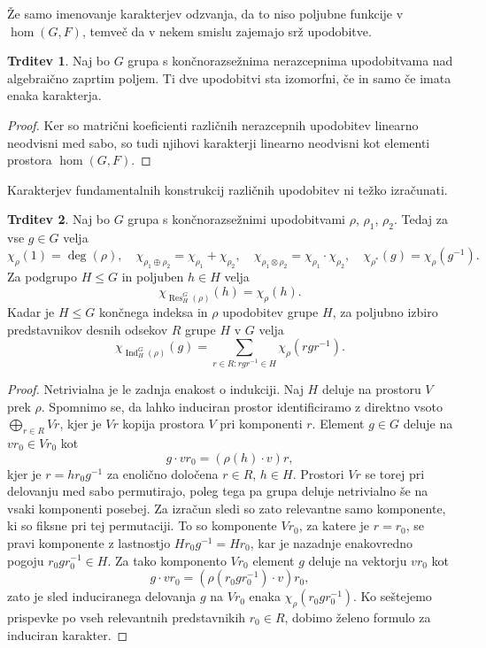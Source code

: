 \documentclass[11pt]{book}
\DeclareMathOperator\Res{Res}
\DeclareMathOperator\Ind{Ind}
\theoremstyle{definition}
\theoremstyle{zgled}
\theoremstyle{odprtproblem}
\theoremstyle{domacanaloga}
\newenvironment{dokaz}
    {\color{siva}\begin{proof}}
    {\end{proof}}
\theoremstyle{izrek}
\newtheorem*{trditev}{Trditev}
\begin{document}
Že samo imenovanje karakterjev odzvanja, da to niso poljubne funkcije v $\hom(G,F)$, temveč da v nekem smislu zajemajo srž upodobitve.

\begin{trditev}
Naj bo $G$ grupa s končnorazsežnima nerazcepnima upodobitvama nad algebraično zaprtim poljem. Ti dve upodobitvi sta izomorfni, če in samo če imata enaka karakterja.
\end{trditev}
\begin{dokaz}
Ker so matrični koeficienti različnih nerazcepnih upodobitev linearno neodvisni med sabo, so tudi njihovi karakterji linearno neodvisni kot elementi prostora $\hom(G,F)$. 
\end{dokaz}

Karakterjev fundamentalnih konstrukcij različnih upodobitev ni težko izračunati.

\begin{trditev}
Naj bo $G$ grupa s končnorazsežnimi upodobitvami $\rho$, $\rho_1$, $\rho_2$. Tedaj za vse $g \in G$ velja
\[
    \chi_{\rho}(1) = \deg(\rho), \quad
    \chi_{\rho_1 \oplus \rho_2} = \chi_{\rho_1} + \chi_{\rho_2}, \quad
    \chi_{\rho_1 \otimes \rho_2} = \chi_{\rho_1} \cdot \chi_{\rho_2}, \quad
    \chi_{\rho^*}(g) = \chi_{\rho}(g^{-1}).
\]
Za podgrupo $H \leq G$ in poljuben $h \in H$ velja
\[
    \chi_{\Res^G_H(\rho)}(h) = \chi_{\rho}(h).
\]
Kadar je $H \leq G$ končnega indeksa in $\rho$ upodobitev grupe $H$, za poljubno izbiro predstavnikov desnih odsekov $R$ grupe $H$ v $G$ velja
\[
    \chi_{\Ind^G_H(\rho)}(g) = \sum_{r \in R \colon r g r^{-1} \in H} \chi_{\rho}(r g r^{-1}).
\]
\end{trditev}
\begin{dokaz}
Netrivialna je le zadnja enakost o indukciji. Naj $H$ deluje na prostoru $V$ prek $\rho$. Spomnimo se, da lahko induciran prostor identificiramo z direktno vsoto $\bigoplus_{r \in R} V r$, kjer je $Vr$ kopija prostora $V$ pri komponenti $r$. Element $g \in G$ deluje na $v r_0 \in V r_0$ kot
\[
    g \cdot v r_0 = \left( \rho(h) \cdot v \right) r,
\]
kjer je $r = h r_0 g^{-1}$ za enolično določena $r \in R$, $h \in H$. Prostori $V r$ se torej pri delovanju med sabo permutirajo, poleg tega pa grupa deluje netrivialno še na vsaki komponenti posebej. Za izračun sledi so zato relevantne samo komponente, ki so fiksne pri tej permutaciji. To so komponente $Vr_0$, za katere je $r = r_0$, se pravi komponente z lastnostjo $H r_0 g^{-1} = H r_0$, kar je nazadnje enakovredno pogoju $r_0 g r_0^{-1} \in H$. Za tako komponento $V r_0$ element $g$ deluje na vektorju $v r_0$ kot
\[
    g \cdot v r_0 = \left( \rho(r_0 g r_0^{-1}) \cdot v \right) r_0,
\]
zato je sled induciranega delovanja $g$ na $V r_0$ enaka $\chi_{\rho}(r_0 g r_0^{-1})$. Ko seštejemo prispevke po vseh relevantnih predstavnikih $r_0 \in R$, dobimo želeno formulo za induciran karakter.
\end{dokaz}
\end{document}
